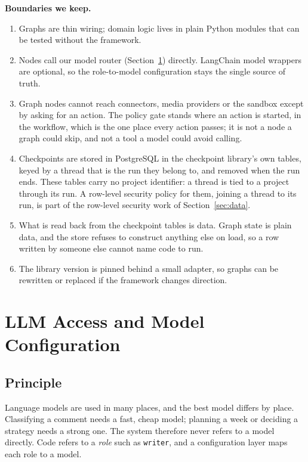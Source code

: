 \documentclass[11pt,a4paper]{article}
\begin{document}
\textbf{Boundaries we keep.}
\begin{enumerate}
  \item Graphs are thin wiring; domain logic lives in plain Python modules that can be tested without the framework.
  \item Nodes call our model router (Section~\ref{sec:llm}) directly. LangChain model wrappers are optional, so the role-to-model configuration stays the single source of truth.
  \item Graph nodes cannot reach connectors, media providers or the sandbox except by asking for an action. The policy gate stands where an action is started, in the workflow, which is the one place every action passes; it is not a node a graph could skip, and not a tool a model could avoid calling.
  \item Checkpoints are stored in PostgreSQL in the checkpoint library's own tables, keyed by a thread that is the run they belong to, and removed when the run ends. These tables carry no project identifier: a thread is tied to a project through its run. A row-level security policy for them, joining a thread to its run, is part of the row-level security work of Section~\ref{sec:data}.
  \item What is read back from the checkpoint tables is data. Graph state is plain data, and the store refuses to construct anything else on load, so a row written by someone else cannot name code to run.
  \item The library version is pinned behind a small adapter, so graphs can be rewritten or replaced if the framework changes direction.
\end{enumerate}

\section{LLM Access and Model Configuration}\label{sec:llm}

\subsection{Principle}
Language models are used in many places, and the best model differs by place. Classifying a comment needs a fast, cheap model; planning a week or deciding a strategy needs a strong one. The system therefore never refers to a model directly. Code refers to a \emph{role} such as \texttt{writer}, and a configuration layer maps each role to a model.
\end{document}
